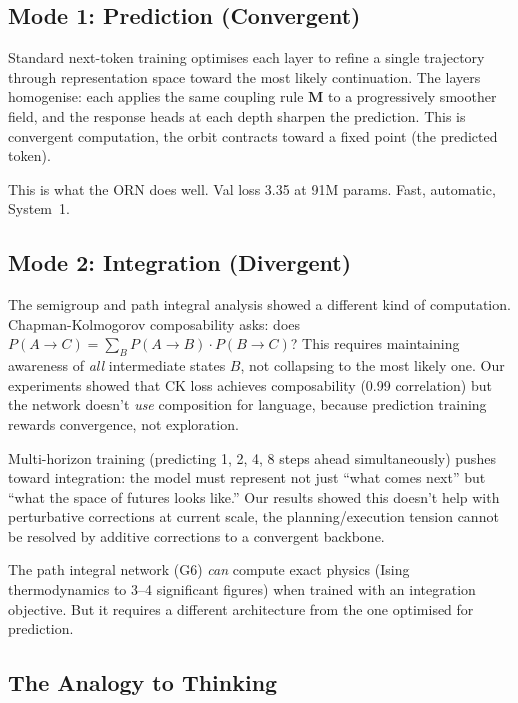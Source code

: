 \documentclass[11pt, a4paper]{article}
\newcommand{\M}{\mathbf{M}}
\theoremstyle{plain}
\theoremstyle{definition}
\theoremstyle{remark}
\begin{document}
\subsection{Mode 1: Prediction (Convergent)}

Standard next-token training optimises each layer to refine a single trajectory through representation space toward the most likely continuation.
The layers homogenise: each applies the same coupling rule $\M$ to a progressively smoother field, and the response heads at each depth sharpen the prediction.
This is convergent computation, the orbit contracts toward a fixed point (the predicted token).

This is what the ORN does well.
Val loss 3.35 at 91M params.
Fast, automatic, System~1.

\subsection{Mode 2: Integration (Divergent)}

The semigroup and path integral analysis showed a different kind of computation.
Chapman-Kolmogorov composability asks: does $P(A \to C) = \sum_B P(A \to B) \cdot P(B \to C)$?
This requires maintaining awareness of \emph{all} intermediate states $B$, not collapsing to the most likely one.
Our experiments showed that CK loss achieves composability (0.99 correlation) but the network doesn't \emph{use} composition for language, because prediction training rewards convergence, not exploration.

Multi-horizon training (predicting 1, 2, 4, 8 steps ahead simultaneously) pushes toward integration: the model must represent not just ``what comes next'' but ``what the space of futures looks like.''
Our results showed this doesn't help with perturbative corrections at current scale, the planning/execution tension cannot be resolved by additive corrections to a convergent backbone.

The path integral network (G6) \emph{can} compute exact physics (Ising thermodynamics to 3--4 significant figures) when trained with an integration objective.
But it requires a different architecture from the one optimised for prediction.

\subsection{The Analogy to Thinking}
\end{document}

